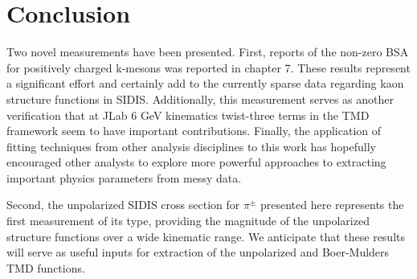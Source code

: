 \chapter{Conclusion}

Two novel measurements have been presented.  First, reports of the non-zero BSA for positively charged k-mesons was reported in chapter 7.  These results represent a significant effort and certainly add to the currently sparse data regarding kaon structure functions in SIDIS.  Additionally, this measurement serves as another verification that at JLab 6 GeV kinematics twist-three terms in the TMD framework seem to have important contributions.  Finally, the application of fitting techniques from other analysis disciplines to this work has hopefully encouraged other analysts to explore more powerful approaches to extracting important physics parameters from messy data.  

Second, the unpolarized SIDIS cross section for $\pi^{\pm}$ presented here represents the first measurement of its type, providing the magnitude of the unpolarized structure functions over a wide kinematic range.  We anticipate that these results will serve as useful inputs for extraction of the unpolarized and Boer-Mulders TMD functions.

